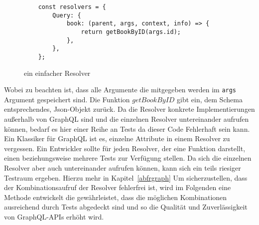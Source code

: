 \begin{figure}[htb]
    \begin{verbatim}
    const resolvers = {
        Query: {
            book: (parent, args, context, info) => {
                return getBookByID(args.id);
            },
        },
    };
    \end{verbatim}
    \caption{ein einfacher Resolver}
    \label{simpleresolver}
\end{figure}

Wobei zu beachten ist, dass alle Argumente die mitgegeben werden im \verb+args+ Argument gespeichert sind.
Die Funktion $getBookByID$ gibt ein, dem Schema entsprechendes, Json-Objekt zurück.
Da die Resolver konkrete Implementierungen außerhalb von GraphQL sind und die einzelnen Resolver untereinander aufrufen können, bedarf es hier
einer Reihe an Tests da dieser Code Fehlerhaft sein kann.
Ein Klassiker für GraphQL ist es, einzelne Attribute in einem Resolver zu vergessen.
Ein Entwickler sollte für jeden Resolver, der eine Funktion darstellt, einen beziehungsweise mehrere Tests zur Verfügung stellen.
Da sich die einzelnen Resolver aber auch untereinander aufrufen können, kann sich ein teils riesiger Testraum ergeben.
Hierzu mehr in Kapitel~\ref{abfrgraph}
Um sicherzustellen, dass der Kombinationsaufruf der Resolver fehlerfrei ist, wird im Folgenden eine Methode entwickelt die gewährleistet,
dass die möglichen Kombinationen ausreichend durch Tests abgedeckt sind und so die Qualität und Zuverlässigkeit von GraphQL-APIs erhöht wird.
